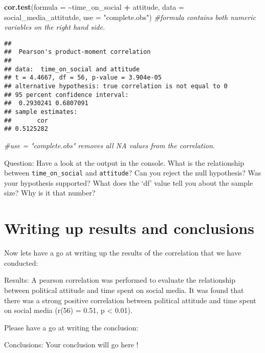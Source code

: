\documentclass[
]{book}
\newenvironment{Shaded}{\begin{snugshade}}{\end{snugshade}}
\newcommand{\AttributeTok}[1]{\textcolor[rgb]{0.13,0.29,0.53}{#1}}
\newcommand{\CommentTok}[1]{\textcolor[rgb]{0.56,0.35,0.01}{\textit{#1}}}
\newcommand{\FunctionTok}[1]{\textcolor[rgb]{0.13,0.29,0.53}{\textbf{#1}}}
\newcommand{\NormalTok}[1]{#1}
\newcommand{\SpecialCharTok}[1]{\textcolor[rgb]{0.81,0.36,0.00}{\textbf{#1}}}
\newcommand{\StringTok}[1]{\textcolor[rgb]{0.31,0.60,0.02}{#1}}
\begin{document}
\begin{Shaded}
\begin{Highlighting}[]
\FunctionTok{cor.test}\NormalTok{(}\AttributeTok{formula =} \SpecialCharTok{\textasciitilde{}}\NormalTok{time\_on\_social }\SpecialCharTok{+}\NormalTok{ attitude, }\AttributeTok{data =}\NormalTok{ social\_media\_attitutde, }\AttributeTok{use =} \StringTok{"complete.obs"}\NormalTok{) }\CommentTok{\#formula contains both numeric variables on the right hand side.}
\end{Highlighting}
\end{Shaded}

\begin{verbatim}
## 
##  Pearson's product-moment correlation
## 
## data:  time_on_social and attitude
## t = 4.4667, df = 56, p-value = 3.904e-05
## alternative hypothesis: true correlation is not equal to 0
## 95 percent confidence interval:
##  0.2930241 0.6807091
## sample estimates:
##       cor 
## 0.5125282
\end{verbatim}

\begin{Shaded}
\begin{Highlighting}[]
\CommentTok{\#use = "complete.obs" removes all NA values from the correlation. }
\end{Highlighting}
\end{Shaded}

Question: Have a look at the output in the console. What is the relationship between \texttt{time\_on\_social} and \texttt{attitude}? Can you reject the null hypothesis? Was your hypothesis supported? What does the `df' value tell you about the sample size? Why is it that number?

\section{Writing up results and conclusions}\label{writing-up-results-and-conclusions-2}

Now lets have a go at writing up the results of the correlation that we have conducted:

Results: A pearson correlation was performed to evaluate the relationship between political attitude and time spent on social media. It was found that there was a strong positive correlation between political attitude and time spent on social media (r(56) = 0.51, p \textless{} 0.01).

Please have a go at writing the conclusion:

Conclusions: Your conclusion will go here !
\end{document}
